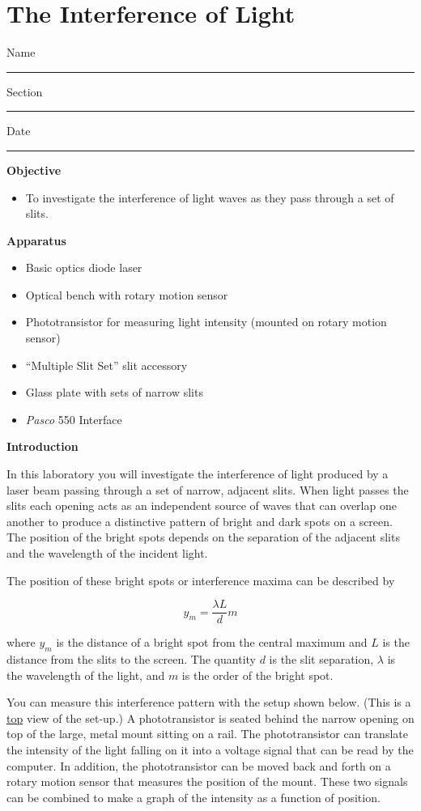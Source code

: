 
\section{The Interference of Light}

Name \rule{2.0in}{0.1pt}\hfill{}Section \rule{1.0in}{0.1pt}\hfill{}Date
\rule{1.0in}{0.1pt}

\textbf{Objective}

\begin{itemize}
\item To investigate the interference of light waves as they pass through
a set of slits. 
\end{itemize}
\textbf{Apparatus}

\begin{itemize}
\item Basic optics diode laser
\item Optical bench with rotary motion sensor
\item Phototransistor for measuring light intensity (mounted on rotary motion sensor)
\item ``Multiple Slit Set'' slit accessory
\item Glass plate with sets of narrow slits
\item {\it Pasco} 550 Interface
\end{itemize}
\textbf{Introduction}

In this laboratory you will investigate the interference of light
produced by a laser beam passing through a set of narrow, adjacent
slits. When light passes the slits each opening acts as an independent
source of waves that can overlap one another to produce a distinctive
pattern of bright and dark spots on a screen. The position of the
bright spots depends on the separation of the adjacent slits and the
wavelength of the incident light. 

The position of these bright spots or interference maxima can be described by

\[
y_{m}=\frac{\lambda L}{d}m\]

where $y_{m}$ is the distance of a bright spot from the central
maximum and $L$ is
the distance from the slits to the screen. The quantity $d$
is the slit separation, \( \lambda  \) is the wavelength of the light,
and $m$ is the order of the bright spot. 

You can measure this interference pattern with the setup shown below. 
(This is a \underline{top} view of the set-up.) 
A phototransistor is seated behind the narrow opening on top of the large,
metal mount sitting on a rail. The phototransistor can translate the intensity 
of the light falling on it into a voltage signal that can be read by the
computer. In addition, the phototransistor can be moved back and
forth on a rotary motion sensor that measures the position of the 
mount. These two signals can be combined to
make a graph of the intensity as a function of position.

